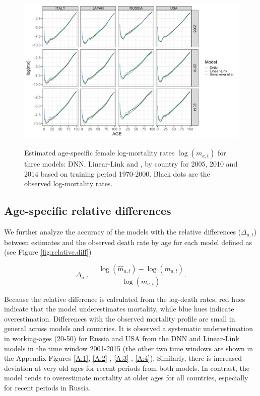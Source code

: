 \documentclass[a4,11pt]{article}
\begin{document}
\begin{figure}[H]
	\centering
	\includegraphics[width=1\linewidth]{age_pattern_F_1970}\\
	 \caption{Estimated age-specific female log-mortality rates $\log(m_{a,t})$ for three models: DNN, Linear-Link and \citet{Sevcikova}, by country for 2005, 2010 and 2014 based on training period 1970-2000. Black dots are the observed log-mortality rates.} 
	 \label{fig:estimate.age.mx}
\end{figure}



\subsection*{Age-specific relative differences} 


We further analyze the accuracy of the models with the relative differences ($\Delta_{a,t}$) between estimates and the observed death rate by age for each model defined as (see Figure \ref{fig:relative.diff})

$$\Delta_{a,t}=\frac{\log(\hat{m}_{a,t})-\log(m_{a,t})}{\log(m_{a,t})}.$$

Because the relative difference is calculated from the log-death rates, red hues indicate that the model underestimates mortality, while blue hues indicate overestimation. Differences with the observed mortality profile are small in general across models and countries. It is observed a systematic underestimation in working-ages (20-50) for Russia and USA from the DNN and Linear-Link models in the time window 2001-2015 (the other two time windows are shown in the Appendix Figures \ref{A:1}, \ref{A:2} , \ref{A:3} , \ref{A:4}). Similarly, there is increased deviation at very old ages for recent periods from both models. In contrast, the \citet{Sevcikova} model tends to overestimate mortality at older ages for all countries, especially for recent periods in Russia. 
\end{document}
